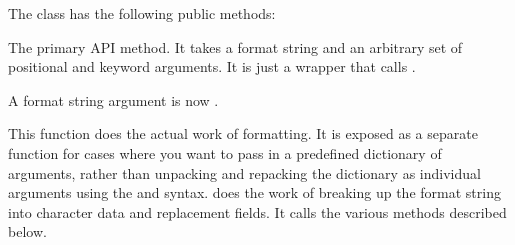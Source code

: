 \documentclass[letterpaper,10pt,english]{sphinxmanual}
\begin{document}
\vspace{5px}

\begin{fulllineitems}
\label{\detokenize{string:string.Formatter}}
The {\hyperref[\detokenize{string:string.Formatter}]{}} class has the following public methods:

\vspace{5px}

\begin{fulllineitems}
\label{\detokenize{string:string.Formatter.format}}
The primary API method.  It takes a format string and
an arbitrary set of positional and keyword arguments.
It is just a wrapper that calls {\hyperref[\detokenize{string:string.Formatter.vformat}]{}}.

A format string argument is now .

\end{fulllineitems}


\vspace{5px}

\begin{fulllineitems}
\label{\detokenize{string:string.Formatter.vformat}}
This function does the actual work of formatting.  It is exposed as a
separate function for cases where you want to pass in a predefined
dictionary of arguments, rather than unpacking and repacking the
dictionary as individual arguments using the  and 
syntax.  {\hyperref[\detokenize{string:string.Formatter.vformat}]{}} does the work of breaking up the format string
into character data and replacement fields.  It calls the various
methods described below.


\end{fulllineitems}
\end{fulllineitems}
\end{document}
